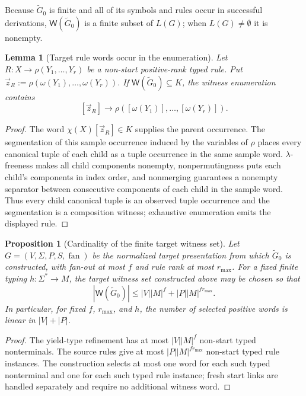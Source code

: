 \documentclass[11pt]{article}
\numberwithin{equation}{section}
\theoremstyle{plain}
\newtheorem{lemma}[theorem]{Lemma}
\newtheorem{proposition}[theorem]{Proposition}
\theoremstyle{definition}
\theoremstyle{remark}
\newcommand{\Wit}{\mathsf{W}}
\newcommand{\tuple}[1]{\vec{#1}}
\newcommand{\fan}{\operatorname{fan}}
\begin{document}
Because $\widetilde G_0$ is finite and all of its symbols and rules occur in
successful derivations, $\Wit(\widetilde G_0)$ is a finite subset of $L(G)$;
when $L(G)\ne\emptyset$ it is nonempty.

\begin{lemma}[Target rule words occur in the enumeration]
\label{lem:exposed-rule-enumerated}
Let $R:X\to\rho(Y_1,\ldots,Y_r)$ be a non-start positive-rank typed rule.
Put $\tuple z_R:=\rho(\omega(Y_1),\ldots,\omega(Y_r))$.  If
$\Wit(\widetilde G_0)\subseteq K$, the witness enumeration contains
\[
  [\tuple z_R]\to\rho([\omega(Y_1)],\ldots,[\omega(Y_r)]).
\]
\end{lemma}

\begin{proof}
The word $\chi(X)[\tuple z_R]\in K$ supplies the parent occurrence.
The segmentation of this sample occurrence induced by the variables of
$\rho$ places every canonical tuple of each child as a tuple occurrence in the same sample word.  $\lambda$-freeness makes all child components nonempty, nonpermutingness
puts each child's components in index order, and nonmerging guarantees a
nonempty separator between consecutive components of each child in the
sample word.  Thus every child canonical tuple is an observed tuple occurrence and the
segmentation is a composition witness; exhaustive enumeration emits the
displayed rule.
\end{proof}


\begin{proposition}[Cardinality of the finite target witness set]
\label{prop:witness-cardinality}
Let $G=(V,\Sigma,P,S,\fan)$ be the normalized target presentation from which
$\widetilde G_0$ is constructed, with fan-out at most
$f$ and rule rank at most $r_{\max}$.  For a fixed finite typing
$h:\Sigma^*\to M$, the target witness set constructed
above may be chosen so that
\[
  |\Wit(\widetilde G_0)|
  \le |V||M|^f+|P||M|^{f r_{\max}}.
\]
In particular, for fixed $f$, $r_{\max}$, and $h$, the number of selected positive
words is linear in $|V|+|P|$.
\end{proposition}

\begin{proof}
The yield-type refinement has at most $|V||M|^f$ non-start typed nonterminals.
The source rules give at most $|P||M|^{f r_{\max}}$ non-start typed rule
instances.  The construction selects at most one word for each such typed
nonterminal and one for each such typed rule instance; fresh start links are
handled separately and require no additional witness word.
\end{proof}
\end{document}
